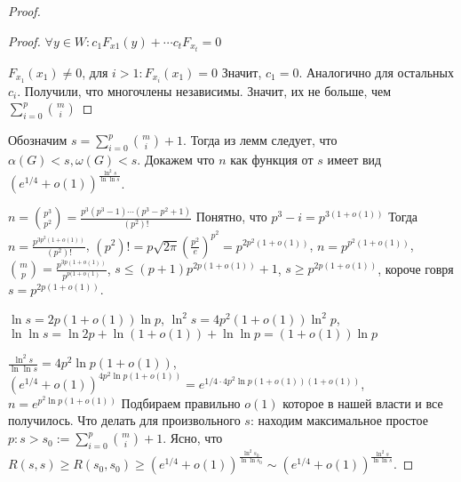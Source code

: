 \documentclass[document.tex]{subfiles}
\begin{document}
\begin{proof}
\begin{proof}
        $\forall y \in W: c_1F_{x1}(y) + \cdots c_tF_{x_t} = 0$

        $F_{x_1}(x_1) \neq 0$, для $i > 1: F_{x_i}(x_1) = 0$ Значит, $c_1 = 0$. Аналогично для остальных $c_i$.
        Получили, что многочлены независимы. Значит, их не больше, чем $\sum_{i = 0}^p \binom{m}{i}$

    \end{proof}
    Обозначим $s = \sum_{i = 0}^p \binom{m}{i} + 1$. Тогда из лемм следует, что $\alpha(G) < s, \omega(G) < s$. Докажем
    что $n$ как функция от $s$ имеет вид $(e^{1/4} + o(1))^{\frac{\ln^2 s}{\ln \ln s}}$.

    $n = \binom{p^3}{p^2} = \frac{p^3(p^3 - 1)\cdots (p^3 - p^2 + 1)}{(p^2)!}$ Понятно, что $p^3 - i = p^{3 (1 + o(1))}$
    Тогда $n = \frac{p^{3p^2(1+o(1))}}{(p^2)!}$, $(p^2)! = p\sqrt{2\pi}\left(\frac{p^2}{e}\right)^{p^2} =
    p^{2p^2(1+o(1))}$, $n = p^{p^2(1+o(1))}$, $\binom{m}{p} = \frac{p^{3p(1+o(1))}}{p^{p(1+o(1)}}$, $s \leq
    (p+1)p^{2p(1+o(1))} + 1$, $s \geq p^{2p(1+o(1))}$, короче говря $s = p^{2p(1+o(1))}$.

    $\ln s = 2p(1+o(1))\ln p$, $\ln^2 s = 4p^2(1+o(1))\ln^2 p$, $\ln \ln s = \ln 2p + \ln (1+o(1)) + \ln \ln p =
    (1+o(1))\ln p$

    $\frac{\ln^2 s}{\ln \ln s} = 4p^2\ln p (1+o(1))$, $(e^{1/4}+o(1))^{4p^2 \ln p (1+o(1))} = e^{1/4 \cdot 4 p^2 \ln p
    (1+o(1)) (1+o(1))}$, $n = e^{p^2 \ln p (1+o(1))}$ Подбираем правильно $o(1)$ которое в нашей власти и все
    получилось.
    Что делать для произвольного $s$: находим максимальное простое $p: s > s_0 := \sum_{i = 0}^p \binom{m}{i} + 1$.
    Ясно, что $R(s, s) \geq R(s_0, s_0) \geq (e^{1/4}+o(1))^{\frac{\ln^2 s_0}{\ln \ln s_0}} \sim (e^{1/4} +
    o(1))^{\frac{\ln^2 s}{\ln \ln s}}$.
\end{proof}
\end{document}
